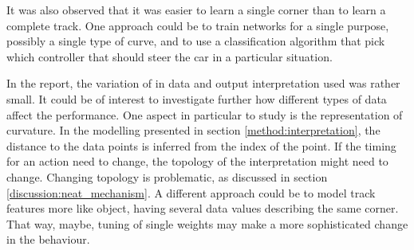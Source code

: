 It was also observed that it was easier to learn a single corner than to learn a complete track. One approach could be to train networks for a single purpose, possibly a single type of curve, and to use a classification algorithm that pick which controller that should steer the car in a particular situation.

In the report, the variation of in data and output interpretation used was rather small. It could be of interest to investigate further how different types of data affect the performance. One aspect in particular to study is the representation of curvature. In the modelling presented in section \ref{method:interpretation}, the distance to the data points is inferred from the index of the point. If the timing for an action need to change, the topology of the interpretation might need to change. Changing topology is problematic, as discussed in section \ref{discussion:neat_mechanism}. A different approach could be to model track features more like object, having several data values describing the same corner. That way, maybe, tuning of single weights may make a more sophisticated change in the behaviour.










